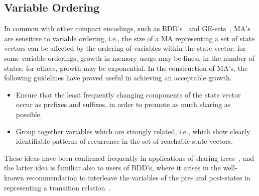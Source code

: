 \subsection{Variable Ordering}\label{ss:sgvarord}
In common with other compact encodings, such as BDD's~\cite{bry:86}
and GE-sets~\cite{gre:96}, MA's are sensitive to variable ordering,
i.e., the size of a MA representing a set of state vectors can be
affected by the ordering of variables within the state vector: for
some variable orderings, growth in memory usage may be linear in the
number of states; for others, growth may be exponential. In the
construction of MA's, the following guidelines have proved useful in
achieving an acceptable growth.
\begin{itemize}
\item Ensure that the least frequently changing components of the state vector
occur as prefixes and suffixes, in order to promote as much sharing as 
possible. 
\item Group together variables which are strongly related, i.e., which 
show clearly identifiable patterns of recurrence in the set of reachable state
vectors.
\end{itemize}
These ideas have been confirmed frequently in applications of 
sharing trees~\cite{ggz:95,gre:96,zam:97}, and 
the latter idea is familiar also to users of BDD's, where it arises
in the well-known recommendation to interleave the variables of the
pre- and post-states in representing a transition relation~\cite{bry:92}. 


